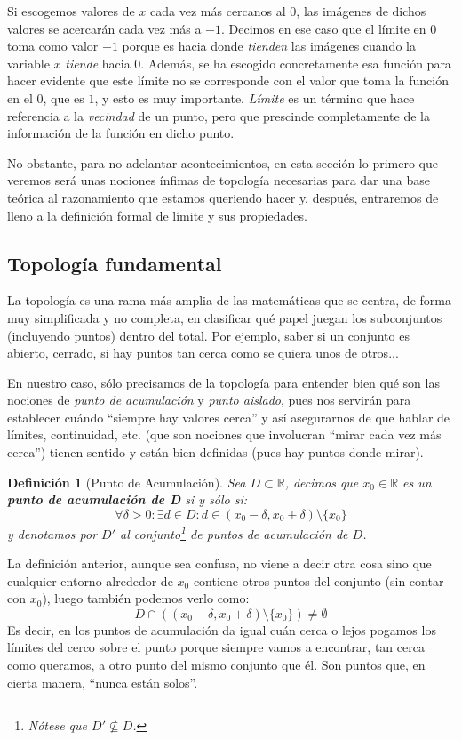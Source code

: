 \documentclass[10pt,a4paper,openright]{book}
\theoremstyle{break}
\newtheorem{defi}{Definición}[chapter]
\begin{document}
Si escogemos valores de $x$ cada vez más cercanos al $0$, las imágenes de dichos valores se acercarán cada vez más a $-1$. Decimos en ese caso que el límite en $0$ toma como valor $-1$ porque es hacia donde \textit{tienden} las imágenes cuando la variable $x$ \textit{tiende} hacia $0$. Además, se ha escogido concretamente esa función para hacer evidente que este límite no se corresponde con el valor que toma la función en el $0$, que es $1$, y esto es muy importante. \textit{Límite} es un término que hace referencia a la \textit{vecindad} de un punto, pero que prescinde completamente de la información de la función en dicho punto.

No obstante, para no adelantar acontecimientos, en esta sección lo primero que veremos será unas nociones ínfimas de topología necesarias para dar una base teórica al razonamiento que estamos queriendo hacer y, después, entraremos de lleno a la definición formal de límite y sus propiedades.

\subsection{Topología fundamental}
La topología es una rama más amplia de las matemáticas que se centra, de forma muy simplificada y no completa, en clasificar qué papel juegan los subconjuntos (incluyendo puntos) dentro del total. Por ejemplo, saber si un conjunto es abierto, cerrado, si hay puntos tan cerca como se quiera unos de otros...

En nuestro caso, sólo precisamos de la topología para entender bien qué son las nociones de \textit{punto de acumulación} y \textit{punto aislado}, pues nos servirán para establecer cuándo ``siempre hay valores cerca'' y así asegurarnos de que hablar de límites, continuidad, etc. (que son nociones que involucran ``mirar cada vez más cerca'') tienen sentido y están bien definidas (pues hay puntos donde mirar).

\begin{defi}[Punto de Acumulación]
Sea $D\subset \mathbb R$, decimos que $x_0\in \mathbb R$ es un \textbf{punto de acumulación de D} si y sólo si:
$$\forall \delta>0: \exists d\in D: d\in (x_0-\delta, x_0+\delta)\setminus\{x_0\}$$
y denotamos por $D'$ al conjunto\footnote{Nótese que $D'\nsubseteq D$.} de puntos de acumulación de $D$.
\end{defi}

La definición anterior, aunque sea confusa, no viene a decir otra cosa sino que cualquier entorno alrededor de $x_0$ contiene otros puntos del conjunto (sin contar con $x_0$), luego también podemos verlo como:
\[
D\cap \left((x_0-\delta, x_0+\delta)\setminus \{x_0\}\right)\neq \emptyset
\]
Es decir, en los puntos de acumulación da igual cuán cerca o lejos pogamos los límites del cerco sobre el punto porque siempre vamos a encontrar, tan cerca como queramos, a otro punto del mismo conjunto que él. Son puntos que, en cierta manera, ``nunca están solos''.
\end{document}
